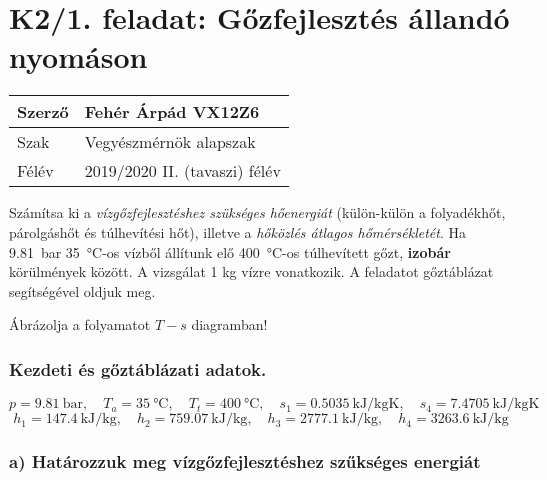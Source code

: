 \section*{K2/1. feladat: Gőzfejlesztés állandó nyomáson}

\begin{tabular}{ | p{2cm} | p{14cm} | } 
	\hline
	Szerző & Fehér Árpád VX12Z6 \\ 
	\hline
	Szak & Vegyészmérnök alapszak \\ 
	\hline
	Félév & 2019/2020 II. (tavaszi) félév \\ 
	\hline
\end{tabular}
\vspace{0.5cm}

\noindent Számítsa ki a \textit{vízgőzfejlesztéshez szükséges hőenergiát} (külön-külön a folyadékhőt, párolgáshőt és túlhevítési hőt), illetve a \textit{hőközlés átlagos hőmérsékletét}. Ha \SI{9,81}{\bar} \SI{35}{\celsius}-os vízből állítunk elő \SI{400}{\celsius}-os túlhevített gőzt, \textbf{izobár} körülmények között. A vizsgálat 1 kg vízre vonatkozik. A feladatot gőztáblázat segítségével oldjuk meg.

\vspace{2mm}
\noindent Ábrázolja a folyamatot $T-s$ diagramban!

\subsubsection{Kezdeti és gőztáblázati adatok.}
\begin{equation*}
p = \SI{9,81}{\bar}, 
\quad 
T_a = \SI{35}{\celsius}, 
\quad
T_t = \SI{400}{\celsius},
\quad
s_1 = \SI{0,5035}{\kilo\joule\per\kilogram\kelvin},
\quad
s_4 = \SI{7,4705}{\kilo\joule\per\kilogram\kelvin}
\end{equation*}
\begin{equation*}
h_1 = \SI{147,4}{\kilo\joule\per\kilogram},
\quad
h_2 = \SI{759,07}{\kilo\joule\per\kilogram},
\quad
h_3 = \SI{2777,1}{\kilo\joule\per\kilogram},
\quad
h_4 = \SI{3263,6}{\kilo\joule\per\kilogram}
\end{equation*}

\noindent\hrulefill

\subsubsection*{a) Határozzuk meg vízgőzfejlesztéshez szűkséges energiát}

